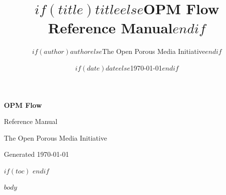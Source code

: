 \documentclass[11pt,a4paper,oneside,openright]{book}
\title{$if(title)$$title$$else$OPM Flow Reference Manual$endif$}
\author{$if(author)$$author$$else$The Open Porous Media Initiative$endif$}
\date{$if(date)$$date$$else$\today$endif$}
\begin{document}
\frontmatter
\begin{titlepage}
  \centering
  \vspace*{4cm}
  {\Huge\bfseries OPM Flow\par}
  \vspace{0.6cm}
  {\LARGE Reference Manual\par}
  \vfill
  {\large The Open Porous Media Initiative\par}
  {\small Generated \today\par}
\end{titlepage}

$if(toc)$
\tableofcontents
\clearpage
$endif$

\mainmatter
$body$

\backmatter
\end{document}

